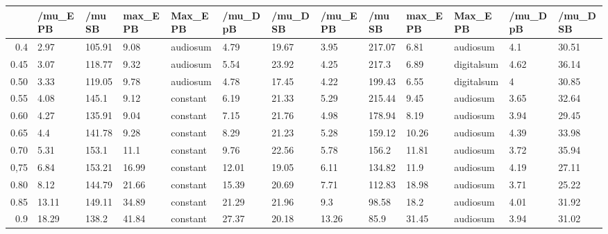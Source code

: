 \begin{table}[ht]
\centering
\begin{tabular}{rllllllllllll}
  \hline
 & /mu\_E PB & /mu SB & max\_E PB & Max\_E PB & /mu\_D pB & /mu\_D SB & /mu\_E PB & /mu SB & max\_E PB & Max\_E PB & /mu\_D pB & /mu\_D SB \\ 
  \hline
0.4 & 2.97 & 105.91 & 9.08 & audiosum & 4.79 & 19.67 & 3.95 & 217.07 & 6.81 & audiosum & 4.1 & 30.51 \\ 
  0.45 & 3.07 & 118.77 & 9.32 & audiosum & 5.54 & 23.92 & 4.25 & 217.3 & 6.89 & digitalsum & 4.62 & 36.14 \\ 
  0.50 & 3.33 & 119.05 & 9.78 & audiosum & 4.78 & 17.45 & 4.22 & 199.43 & 6.55 & digitalsum & 4 & 30.85 \\ 
  0.55 & 4.08 & 145.1 & 9.12 & constant & 6.19 & 21.33 & 5.29 & 215.44 & 9.45 & audiosum & 3.65 & 32.64 \\ 
  0.60 & 4.27 & 135.91 & 9.04 & constant & 7.15 & 21.76 & 4.98 & 178.94 & 8.19 & audiosum & 3.94 & 29.45 \\ 
  0.65 & 4.4 & 141.78 & 9.28 & constant & 8.29 & 21.23 & 5.28 & 159.12 & 10.26 & audiosum & 4.39 & 33.98 \\ 
  0.70 & 5.31 & 153.1 & 11.1 & constant & 9.76 & 22.56 & 5.78 & 156.2 & 11.81 & audiosum & 3.72 & 35.94 \\ 
  0,75 & 6.84 & 153.21 & 16.99 & constant & 12.01 & 19.05 & 6.11 & 134.82 & 11.9 & audiosum & 4.19 & 27.11 \\ 
  0.80 & 8.12 & 144.79 & 21.66 & constant & 15.39 & 20.69 & 7.71 & 112.83 & 18.98 & audiosum & 3.71 & 25.22 \\ 
  0.85 & 13.11 & 149.11 & 34.89 & constant & 21.29 & 21.96 & 9.3 & 98.58 & 18.2 & audiosum & 4.01 & 31.92 \\ 
  0.9 & 18.29 & 138.2 & 41.84 & constant & 27.37 & 20.18 & 13.26 & 85.9 & 31.45 & audiosum & 3.94 & 31.02 \\ 
   \hline
\end{tabular}
\end{table}
